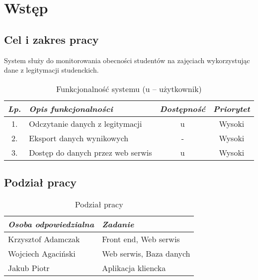 \newpage\section{Wstęp}\label{sec:wstep}
\subsection{Cel i zakres pracy}

System służy do monitorowania obecności studentów na zajęciach wykorzystując dane z legitymacji studenckich. 
\begin{table}[!ht]
\centering
\caption{Funkcjonalność systemu \NazwaSys (u -- użytkownik)}
    \begin{tabular}{|c|p{6cm}|c|c|}
        \hline
        \textit{Lp.} & \textit{Opis funkcjonalności} & \textit{Dostępność}  & \textit{Priorytet} \\ \hline
        1. & Odczytanie danych z legitymacji & u & Wysoki \\ \hline
        2. & Eksport danych wynikowych & - & Wysoki \\ \hline
        3. & Dostęp do danych przez web serwis & u & Wysoki \\ \hline
    \end{tabular}
    \label{table:tab1}
\end{table}

\subsection{Podział pracy}

\begin{table}
\centering
\caption{Podział pracy}
    \begin{tabular}{|p{4cm}|p{5cm}|}
        \hline
        \textit{Osoba odpowiedzialna} & \textit{Zadanie} \\ \hline
        Krzysztof Adamczak & Front end, Web serwis \\ \hline
        Wojciech Agaciński & Web serwis, Baza danych  \\ \hline
        Jakub Piotr & Aplikacja kliencka  \\  \hline
    \end{tabular} 
    \label{table:tab2}
\end{table}